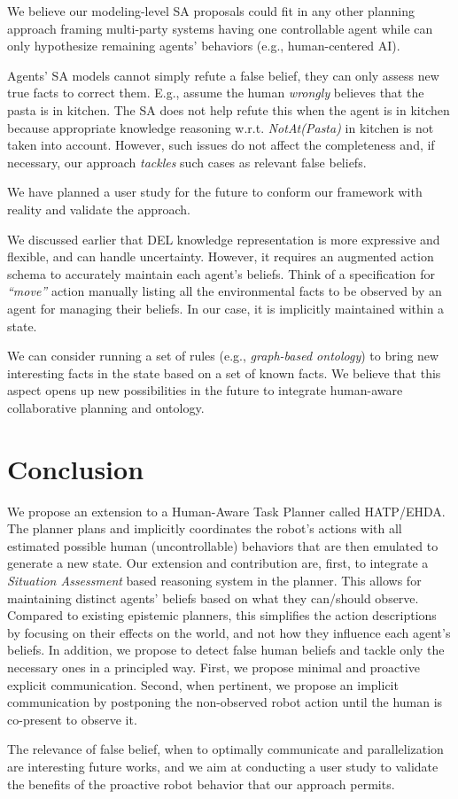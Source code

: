 We believe our modeling-level SA proposals could fit in any other planning approach framing multi-party systems having one controllable agent while can only hypothesize remaining agents' behaviors (e.g., human-centered AI).

Agents' SA models cannot simply refute a false belief, they can only assess new true facts to correct them.
E.g., assume the human \textit{wrongly} believes that the pasta is in \textsf{kitchen}. The SA does not help refute this when the agent is in \textsf{kitchen}
because appropriate knowledge reasoning w.r.t. \textit{NotAt(Pasta)} in \textsf{kitchen} is not taken into account.  
However, such issues do not affect the completeness and, if necessary, our approach \textit{tackles} such cases as relevant false beliefs.

We have planned a user study for the future to conform our framework with reality and validate the approach.

We discussed earlier that DEL knowledge representation is more expressive and flexible, and can handle uncertainty. However, it requires an augmented action schema to accurately maintain each agent's beliefs.
Think of a specification for \textit{``move''} action manually listing all the environmental facts to be observed by an agent for managing their beliefs. In our case, it is implicitly maintained within a state.

We can consider running a set of rules (e.g., \textit{graph-based ontology}) to bring new interesting facts in the state based on a set of known facts. We believe that this aspect opens up new possibilities in the future to integrate human-aware collaborative planning and ontology.

\section{Conclusion}

We propose an extension to a Human-Aware Task Planner called HATP/EHDA. 
The planner plans and implicitly coordinates the robot's actions with all estimated possible human (uncontrollable) behaviors that are then emulated to generate a new state.
Our extension and contribution are, first, to integrate a \textit{Situation Assessment} based reasoning system in the planner. This allows for maintaining distinct agents' beliefs based on what they can/should observe.
Compared to existing epistemic planners, this simplifies the action descriptions by focusing on their effects on the world, and not how they influence each agent's beliefs.
In addition, we propose to detect false human beliefs and tackle only the necessary ones in a principled way. First, we propose minimal and proactive explicit communication. Second, when pertinent, 
we propose an implicit communication by postponing the non-observed robot action until the human is co-present to observe it.  

The relevance of false belief, when to optimally communicate and parallelization are interesting future works, and we aim at conducting a user study to validate the benefits of the proactive robot behavior that our approach permits. 
